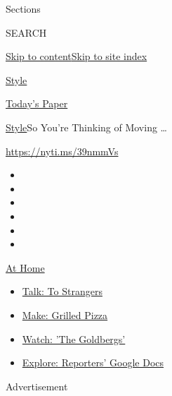Sections

SEARCH

\protect\hyperlink{site-content}{Skip to
content}\protect\hyperlink{site-index}{Skip to site index}

\href{https://www.nytimes.com/section/style}{Style}

\href{https://myaccount.nytimes.com/auth/login?response_type=cookie\&client_id=vi}{}

\href{https://www.nytimes.com/section/todayspaper}{Today's Paper}

\href{/section/style}{Style}\textbar{}So You're Thinking of Moving
\ldots{}

\url{https://nyti.ms/39nmmVs}

\begin{itemize}
\item
\item
\item
\item
\item
\item
\end{itemize}

\href{https://www.nytimes.com/spotlight/at-home?action=click\&pgtype=Article\&state=default\&region=TOP_BANNER\&context=at_home_menu}{At
Home}

\begin{itemize}
\tightlist
\item
  \href{https://www.nytimes.com/2020/08/03/well/family/the-benefits-of-talking-to-strangers.html?action=click\&pgtype=Article\&state=default\&region=TOP_BANNER\&context=at_home_menu}{Talk:
  To Strangers}
\item
  \href{https://www.nytimes.com/2020/08/01/at-home/coronavirus-make-pizza-on-a-grill.html?action=click\&pgtype=Article\&state=default\&region=TOP_BANNER\&context=at_home_menu}{Make:
  Grilled Pizza}
\item
  \href{https://www.nytimes.com/2020/07/31/arts/television/goldbergs-abc-stream.html?action=click\&pgtype=Article\&state=default\&region=TOP_BANNER\&context=at_home_menu}{Watch:
  'The Goldbergs'}
\item
  \href{https://www.nytimes.com/interactive/2020/at-home/even-more-reporters-editors-diaries-lists-recommendations.html?action=click\&pgtype=Article\&state=default\&region=TOP_BANNER\&context=at_home_menu}{Explore:
  Reporters' Google Docs}
\end{itemize}

Advertisement

